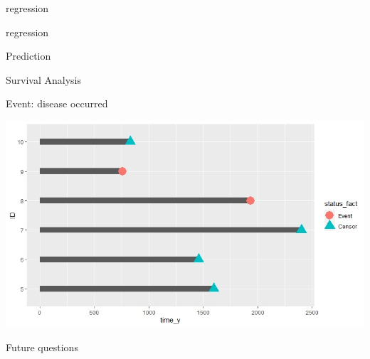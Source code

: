 \documentclass{beamer}
\begin{document}
	\begin{frame}{regression}
		
		
		
		
		
	\end{frame}
	
	\begin{frame}{regression}
		
		
		
	\end{frame}
	
	\begin{frame}{Prediction}
		
	\end{frame}
	
	\begin{frame}{Survival Analysis}
		
		\vspace{0.3 cm}
		Event: disease occurred
		
		\begin{center}
			\includegraphics[width=0.9\columnwidth]{survival_plot2.jpeg}
		\end{center}
	\end{frame}
	
	\begin{frame}{Future questions}
		
	\end{frame}
	
	
\end{document}
